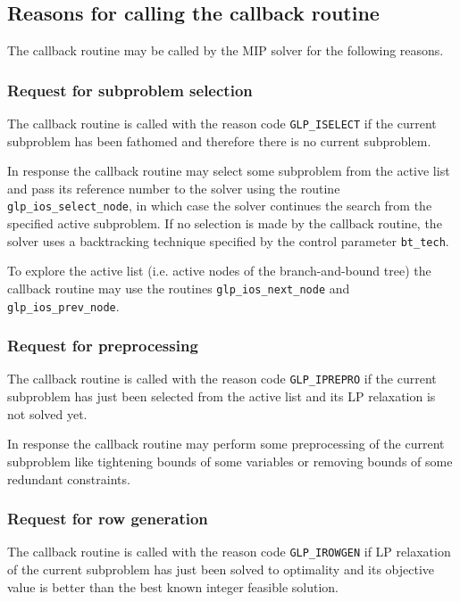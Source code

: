 \subsection{Reasons for calling the callback routine}

The callback routine may be called by the MIP solver for the following
reasons.

\subsubsection*{Request for subproblem selection}

The callback routine is called with the reason code \verb|GLP_ISELECT|
if the current subproblem has been fathomed and therefore there is no
current subproblem.

In response the callback routine may select some subproblem from the
active list and pass its reference number to the solver using the
routine \verb|glp_ios_select_node|, in which case the solver continues
the search from the specified active subproblem. If no selection is made
by the callback routine, the solver uses a backtracking technique
specified by the control parameter \verb|bt_tech|.

To explore the active list (i.e. active nodes of the branch-and-bound
tree) the callback routine may use the routines \verb|glp_ios_next_node|
and \verb|glp_ios_prev_node|.

\subsubsection*{Request for preprocessing}

The callback routine is called with the reason code \verb|GLP_IPREPRO|
if the current subproblem has just been selected from the active list
and its LP relaxation is not solved yet.

In response the callback routine may perform some preprocessing of the
current subproblem like tightening bounds of some variables or removing
bounds of some redundant constraints.

\subsubsection*{Request for row generation}

The callback routine is called with the reason code \verb|GLP_IROWGEN|
if LP relaxation of the current subproblem has just been solved to
optimality and its objective value is better than the best known integer
feasible solution.

